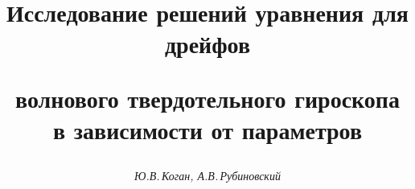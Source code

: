 









\newcommand{\ctg}{\operatorname{ctg}}


\newcommand{\tts}[1]{}







\setcounter{page}{37}















\author{\it Ю.В.\,Коган, А.В.\,Рубиновский}




\title{Исследование решений уравнения для дрейфов


волнового твердотельного гироскопа\\


в зависимости от параметров}





\date{}




\pagestyle{plain} %







\maketitle


